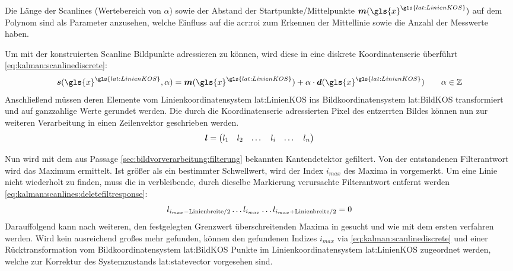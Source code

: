 Die Länge der Scanlines (Wertebereich von \(\alpha\)) sowie der Abstand der Startpunkte/Mittelpunkte \(\vct{m}(\gls{x}^{\gls{lat:LinienKOS}})\) auf dem Polynom sind als Parameter anzusehen, welche Einfluss auf die \gls{acr:roi} zum Erkennen der Mittellinie sowie die Anzahl der Messwerte haben.

Um mit der konstruierten Scanline Bildpunkte adressieren zu können, wird diese in eine diskrete Koordinatenserie überführt \eqref{eq:kalman:scanlinediscrete}:
\begin{equation}
\label{eq:kalman:scanlinediscrete}
\vct{s}(\gls{x}^{\gls{lat:LinienKOS}},\alpha) =
\vct{m}(\gls{x}^{\gls{lat:LinienKOS}})
  + \alpha \cdot \vct{d}(\gls{x}^{\gls{lat:LinienKOS}})
\qquad \alpha \in \mathbb{Z}
\end{equation}
Anschließend müssen deren Elemente vom Linienkoordinatensystem \gls{lat:LinienKOS} ins Bildkoordinatensystem \gls{lat:BildKOS} transformiert und auf ganzzahlige Werte gerundet werden.
Die durch die Koordinatenserie adressierten Pixel des entzerrten Bildes können nun zur weiteren Verarbeitung in einen Zeilenvektor  geschrieben werden. 
 \begin{equation}
 \boldsymbol{l} =
 \begin{pmatrix}
 l_1 & l_2 & \dots & l_i & \dots & l_n
 \end{pmatrix}
 \end{equation}
 
Nun wird  mit dem aus Passage \ref{sec:bildvorverarbeitung:filterung} bekannten Kantendetektor gefiltert. Von der entstandenen Filterantwort  wird das Maximum  ermittelt. Ist  größer als ein bestimmter Schwellwert, wird der Index \begin{math} i_{max} \end{math} des Maxima in  vorgemerkt. Um eine Linie nicht wiederholt zu finden, muss die in  verbleibende, durch dieselbe Markierung verursachte Filterantwort entfernt werden \eqref{eq:kalman:scanlines:deletefiltresponse}:
\begin{equation}
\label{eq:kalman:scanlines:deletefiltresponse}
l_{i_{max}-\text{Linienbreite}/2} \dots l_{i_{max}} 
 \dots  l_{i_{max}+\text{Linienbreite}/2} = 0
 \end{equation}
Darauffolgend kann nach weiteren, den festgelegten Grenzwert überschreitenden Maxima in  gesucht und wie mit dem ersten  verfahren werden.
Wird kein ausreichend großes  mehr gefunden, können den gefundenen Indizes \begin{math} i_{max} \end{math} via \eqref{eq:kalman:scanlinediscrete} und einer Rücktransformation vom Bildkoordinatensystem \gls{lat:BildKOS} Punkte  im Linienkoordinatensystem \gls{lat:LinienKOS} zugeordnet werden, welche zur Korrektur des Systemzustands \gls{lat:statevector} vorgesehen sind.

